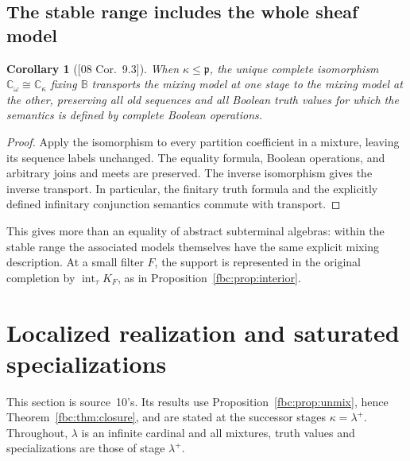 \documentclass[11pt,letterpaper]{article}
\newtheorem{corollary}[theorem]{Corollary}
\theoremstyle{definition}
\theoremstyle{remark}
\newcommand{\om}{\omega}
\newcommand{\B}{\mathbb B}
\newcommand{\C}{\mathbb C}
\newcommand{\cp}{\mathfrak p}
\newcommand{\Int}{\operatorname{int}}
\newcommand{\src}[1]{\textup{[#1]}}
\begin{document}
\subsection{The stable range includes the whole sheaf model}
\begin{corollary}[\src{08 Cor.~9.3}]\label{fbc:cor:model-stable}
When $\kappa\leq\cp$, the unique complete isomorphism
$\C_\om\cong\C_\kappa$ fixing $\B$ transports the mixing model
at one stage to the mixing model at the other, preserving all old
sequences and all Boolean truth values for which the semantics is
defined by complete Boolean operations.
\end{corollary}
\begin{proof}
Apply the isomorphism to every partition coefficient in a mixture,
leaving its sequence labels unchanged. The equality formula,
Boolean operations, and arbitrary joins and meets are preserved.
The inverse isomorphism gives the inverse transport. In particular,
the finitary truth formula and the explicitly defined infinitary
conjunction semantics commute with transport.
\end{proof}

This gives more than an equality of abstract subterminal algebras:
within the stable range the associated models themselves have the
same explicit mixing description. At a small filter $F$, the
support is represented in the original completion by
$\Int_\tau K_F$, as in Proposition~\ref{fbc:prop:interior}.

\section{Localized realization and saturated specializations}
\label{fbc:sec:saturation}

This section is source~10's. Its results use
Proposition~\ref{fbc:prop:unmix}, hence Theorem~\ref{fbc:thm:closure},
and are stated at the successor stages $\kappa=\lambda^+$. Throughout,
$\lambda$ is an infinite cardinal and all mixtures, truth values and
specializations are those of stage $\lambda^+$.
\end{document}
